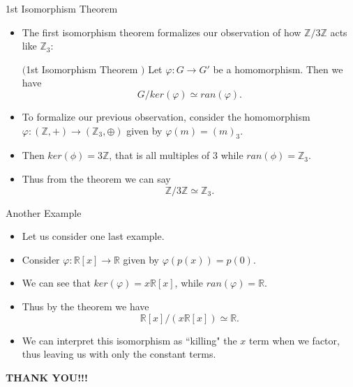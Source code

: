 \documentclass[ %
 10pt, xcolor={dvipsnames,svgnames,x11names,hyperref},
   hyperref={colorlinks=true,citecolor=green,linkcolor=DarkRed,urlcolor=ProcessBlue,anchorcolor=blue}
  ]{beamer}
\newenvironment{stepitemize}{\begin{itemize}[<+->]}{\end{itemize} }
\newcommand{\Z}{\mathbb{Z}}
\newcommand{\R}{\mathbb{R}}
\begin{document}
\begin{frame}{1st Isomorphism Theorem}
\begin{stepitemize}
\item The first isomorphism theorem formalizes our observation of how $\Z/3\Z$ acts like $\Z_3$:
\begin{theorem}$($1st Isomorphism Theorem $)$
Let $\varphi: G\rightarrow G'$ be a homomorphism. Then we have 
$$G/ker(\varphi) \simeq ran(\varphi).$$
\end{theorem}
\item To formalize our previous observation, consider the homomorphism $\varphi:(\Z,+) \rightarrow (\Z_3, \oplus)$ given by $\varphi(m) = (m)_3$. 
\item Then $ker(\phi) = 3\Z$, that is all multiples of $3$ while $ran(\phi) = \Z_3$. 
\item Thus from the theorem we can say 
    $$\Z/3\Z \simeq \Z_3.$$
\end{stepitemize}
\end{frame}

\begin{frame}{Another Example}
\begin{stepitemize}
    \item Let us consider one last example.
    \item Consider $\varphi:\R[x]\rightarrow \R$ given by $\varphi(p(x)) = p(0)$. 
    \item We can see that $ker(\varphi) = x\R[x]$, while $ran(\varphi)=\R$. 
    \item Thus by the theorem we have 
    $$\R[x]/(x\R[x]) \simeq \R.$$ 
    \item We can interpret this isomorphism as ``killing" the $x$ term when we factor, thus leaving us with only the constant terms. 
\end{stepitemize}
\end{frame}
\begin{frame}

\centerline{ \color{blue} \bf{\large THANK YOU!!!}}

\end{frame}
\end{document}
